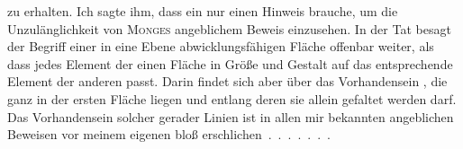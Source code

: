 %
zu erhalten. Ich sagte ihm, dass ein  nur einen Hinweis brauche, um die Unzulänglichkeit von \textsc{Monges} angeblichem Beweis einzusehen. In der Tat besagt der Begriff einer in eine Ebene abwicklungsfähigen Fläche offenbar  weiter, als dass jedes Element der einen Fläche in Größe und Gestalt auf das entsprechende Element der anderen passt. Darin findet sich aber  über das Vorhandensein , die ganz in der ersten Fläche liegen und entlang deren sie allein gefaltet werden darf. Das Vorhandensein solcher gerader Linien ist in allen mir bekannten angeblichen Beweisen vor meinem eigenen bloß \mbox{erschlichen . . . . . . .}

